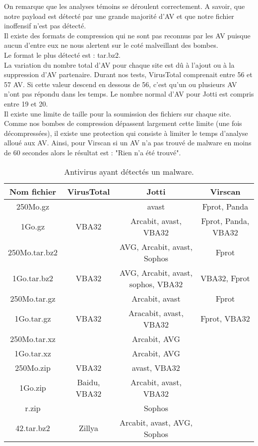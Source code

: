 \documentclass{svjour3}
\begin{document}
On remarque que les analyses témoins se déroulent correctement. A savoir, que notre payload est détecté par une grande majorité d'AV et que notre fichier inoffensif n'est pas détecté.\\
Il existe des formats de compression qui ne sont pas reconnus par les AV puisque aucun d'entre eux ne nous alertent sur le coté malveillant des bombes.\\
Le format le plus détecté est : tar.bz2.\\
La variation du nombre total d'AV pour chaque site est dû à l'ajout ou à la suppression d'AV partenaire. Durant nos tests, VirusTotal comprenait entre 56 et 57 AV. Si cette valeur descend en dessous de 56, c'est qu'un ou plusieurs AV n'ont pas répondu dans les temps. Le nombre normal d'AV pour Jotti est compris entre 19 et 20.\\
Il existe une limite de taille pour la soumission des fichiers sur chaque site. Comme nos bombes de compression dépassent largement cette limite (une fois décompressées), il existe une protection qui consiste à limiter le temps d'analyse alloué aux AV. Ainsi, pour Virscan si un AV n'a pas trouvé de malware en moins de 60 secondes alors le résultat est : "Rien n'a été trouvé".
\begin{table}[ht!]
\begin{tabular}{|c|c|c|c|}
    \hline
     \textbf{Nom fichier} & \textbf{VirusTotal} & \textbf{Jotti} & \textbf{Virscan} \\
     \hline
    250Mo.gz &  & avast & Fprot, Panda\\
    \hline
    1Go.gz & VBA32 & Arcabit, avast, VBA32 & Fprot, Panda, VBA32\\
    \hline
    \hline
    250Mo.tar.bz2 & & AVG, Arcabit, avast, Sophos & Fprot\\
    \hline
    1Go.tar.bz2 & VBA32 & AVG, Arcabit, avast, sophos, VBA32 & VBA32, Fprot\\
    \hline
    \hline
    250Mo.tar.gz & & Arcabit, avast & Fprot\\
    \hline
    1Go.tar.gz & VBA32 & Aracabit, avast, VBA32 & Fprot, VBA32\\
    \hline
    \hline
    250Mo.tar.xz & & Arcabit, AVG & \\
    \hline
    1Go.tar.xz & & Arcabit, AVG & \\
    \hline
    \hline
    250Mo.zip & VBA32 & avast, VBA32 & \\
    \hline
    1Go.zip & Baidu, VBA32 & Arcabit, avast, VBA32 & \\
    \hline
    r.zip &  & Sophos  & \\
    \hline
    \hline
    42.tar.bz2 & Zillya & Arcabit, avast, AVG, Sophos  & \\
    \hline
\end{tabular}
\caption{Antivirus ayant détectés un malware.}
\end{table}
\end{document}
